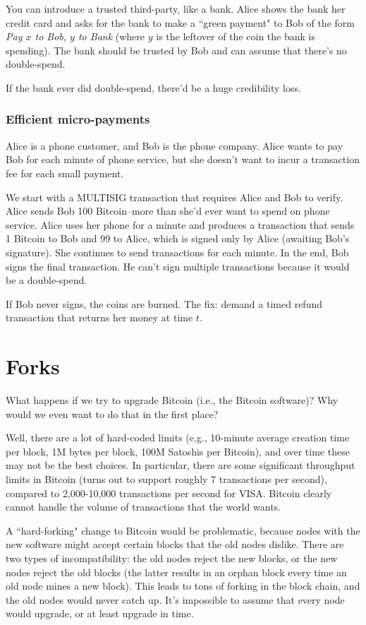 \documentclass[12pt]{article}
\begin{document}
You can introduce a trusted third-party, like a bank. Alice shows the bank her credit card and asks for the bank to make a ``green payment" to Bob of the form \textit{Pay $x$ to Bob, $y$ to Bank} (where $y$ is the leftover of the coin the bank is spending). The bank should be trusted by Bob and can assume that there's no double-spend.

If the bank ever did double-spend, there'd be a huge credibility loss.

\subsubsection*{Efficient micro-payments}

Alice is a phone customer, and Bob is the phone company. Alice wants to pay Bob for each minute of phone service, but she doesn't want to incur a transaction fee for each small payment.

We start with a MULTISIG transaction that requires Alice and Bob to verify. Alice sends Bob 100 Bitcoin--more than she'd ever want to spend on phone service. Alice uses her phone for a minute and produces a transaction that sends 1 Bitcoin to Bob and 99 to Alice, which is signed only by Alice (awaiting Bob's signature). She continues to send transactions for each minute. In the end, Bob signs the final transaction. He can't sign multiple transactions because it would be a double-spend.

If Bob never signs, the coins are burned. The fix: demand a timed refund transaction that returns her money at time $t$.

\section*{Forks}

What happens if we try to upgrade Bitcoin (i.e., the Bitcoin software)? Why would we even want to do that in the first place?

Well, there are a lot of hard-coded limits (e.g., 10-minute average creation time per block, 1M bytes per block, 100M Satoshis per Bitcoin), and over time these may not be the best choices. In particular, there are some significant throughput limits in Bitcoin (turns out to support roughly 7 transactions per second), compared to 2,000-10,000 transactions per second for VISA. Bitcoin clearly cannot handle the volume of transactions that the world wants.

A ``hard-forking" change to Bitcoin would be problematic, because nodes with the new software might accept certain blocks that the old nodes dislike. There are two types of incompatibility: the old nodes reject the new blocks, or the new nodes reject the old blocks (the latter results in an orphan block every time an old node mines a new block). This leads to tons of forking in the block chain, and the old nodes would never catch up. It's impossible to assume that every node would upgrade, or at least upgrade in time.
\end{document}
